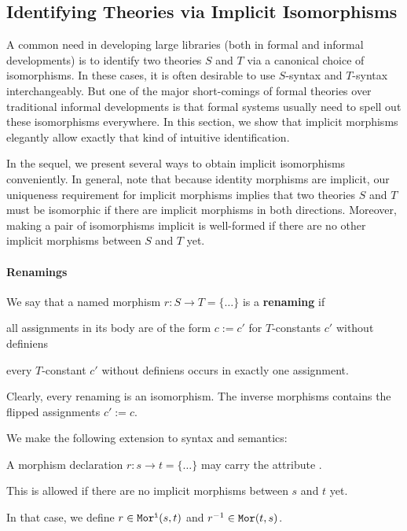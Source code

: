 \subsection{Identifying Theories via Implicit Isomorphisms}\label{sec:inverse}

A common need in developing large libraries (both in formal and informal developments) is to identify two theories $S$ and $T$ via a canonical choice of isomorphisms.
In these cases, it is often desirable to use $S$-syntax and $T$-syntax interchangeably.
But one of the major short-comings of formal theories over traditional informal developments is that formal systems usually need to spell out these isomorphisms everywhere.
In this section, we show that implicit morphisms elegantly allow exactly that kind of intuitive identification.

In the sequel, we present several ways to obtain implicit isomorphisms conveniently.
In general, note that because identity morphisms are implicit, our uniqueness requirement for implicit morphisms implies that two theories $S$ and $T$ must be isomorphic if there are implicit morphisms in both directions.
Moreover, making a pair of isomorphisms implicit is well-formed if there are no other implicit morphisms between $S$ and $T$ yet.

\paragraph{Renamings}
We say that a named morphism $r:S\to T=\{\ldots\}$ is a \textbf{renaming} if
\begin{compactitem}
 \item all assignments in its body are of the form $c:=c'$ for $T$-constants $c'$ without definiens
 \item every  $T$-constant $c'$ without definiens occurs in exactly one assignment.
\end{compactitem}
Clearly, every renaming is an isomorphism.
The inverse morphisms contains the flipped assignments $c':=c$.

We make the following extension to syntax and semantics:
\begin{compactitem}
  \item A morphism declaration $r:s\to t=\{\ldots\}$ may carry the attribute .
  \item This is allowed if there are no implicit morphisms between $s$ and $t$ yet.
  \item In that case, we define $r\in\mathtt{Mor^i}(s,t)$ and $r^{-1}\in\mathtt{Mor}(t,s)$.
\end{compactitem}

